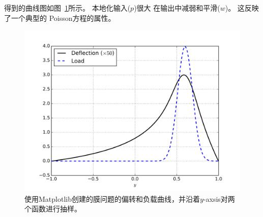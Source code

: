 得到的曲线图如图~\ref{fig:poisson_membrane_curves}所示。 本地化输入($p$)很大
在输出中减弱和平滑($w$)。 这反映了一个典型的
Poisson方程的属性。

\begin{figure}[!ht]  %
 \centerline{\includegraphics[width=0.95\linewidth]{fig/poisson_membrane_curves.png}}
 \caption{
 使用Matplotlib创建的膜问题的偏转和负载曲线，并沿着$y$-axsis对两个函数进行抽样。
 \label{fig:poisson_membrane_curves}
 }
\end{figure}
